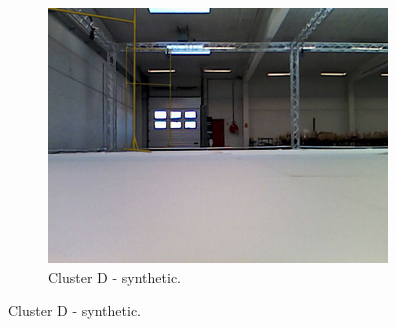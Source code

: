 \begin{figure}[h!]
\begin{subfigure}{0.32\textwidth}
      \includegraphics[width=\textwidth]{figure/tsne_random/D/4.png}
      \caption{Cluster D - synthetic.}
   \end{subfigure}


\end{figure}
